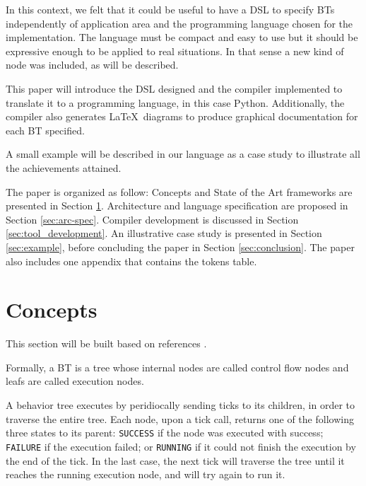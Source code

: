 \documentclass[a4paper,UKenglish,cleveref, autoref, thm-restate]{oasics-v2019}
\begin{document}
In this context, we felt that it could be useful to have a DSL to specify BTs independently of application area and the programming language chosen for the implementation.
The language must be compact and easy to use but it should be expressive enough to be applied to real situations.
In that sense a new kind of node was included, as will be described.

This paper will introduce the DSL designed and the compiler implemented to translate it to a programming language, in this case Python.
Additionally, the compiler also generates \LaTeX\ diagrams to produce graphical documentation for each BT specified.

A small example will be described in our language as a case study to illustrate all the achievements attained.

The paper is organized as follow: Concepts and State of the Art frameworks are presented in Section \ref{sec:concepts}.
Architecture and language specification are proposed in Section \ref{sec:arc-spec}.
Compiler development is discussed in Section \ref{sec:tool_development}.
An illustrative case study is presented in Section \ref{sec:example},
before concluding the paper in Section \ref{sec:conclusion}.
The paper also includes one appendix that contains the tokens table.

\section{Concepts}
\label{sec:concepts}

This section will be built based on references \cite{ColOgr2018,Simpson2014,MilFunge2009}.

Formally, a BT is a tree whose internal nodes are called control flow nodes and leafs are called execution nodes.

A behavior tree executes by peridiocally sending ticks to its children, in order to traverse the entire tree.
Each node, upon a tick call, returns one of the following three states to its parent: \texttt{SUCCESS} if the node was executed with success; \texttt{FAILURE} if the execution failed; or \texttt{RUNNING} if it could not finish the execution by the end of the tick.
In the last case, the next tick will traverse the tree until it reaches the running execution node, and will try again to run it.
\end{document}
